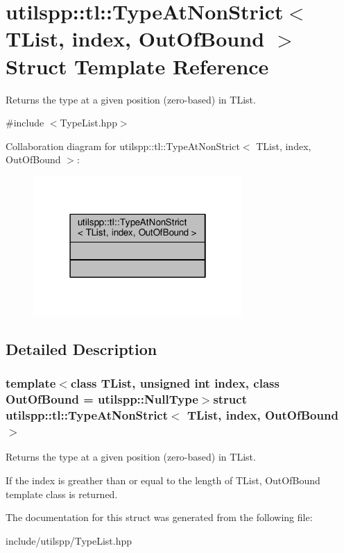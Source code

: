 \hypertarget{structutilspp_1_1tl_1_1TypeAtNonStrict}{\section{utilspp\-:\-:tl\-:\-:Type\-At\-Non\-Strict$<$ T\-List, index, Out\-Of\-Bound $>$ Struct Template Reference}
\label{structutilspp_1_1tl_1_1TypeAtNonStrict}
}


Returns the type at a given position (zero-\/based) in T\-List.  




{\ttfamily \#include $<$Type\-List.\-hpp$>$}



Collaboration diagram for utilspp\-:\-:tl\-:\-:Type\-At\-Non\-Strict$<$ T\-List, index, Out\-Of\-Bound $>$\-:\nopagebreak
\begin{figure}[H]
\begin{center}
\leavevmode
\includegraphics[width=226pt]{structutilspp_1_1tl_1_1TypeAtNonStrict__coll__graph}
\end{center}
\end{figure}


\subsection{Detailed Description}
\subsubsection*{template$<$class T\-List, unsigned int index, class Out\-Of\-Bound = utilspp\-::\-Null\-Type$>$struct utilspp\-::tl\-::\-Type\-At\-Non\-Strict$<$ T\-List, index, Out\-Of\-Bound $>$}

Returns the type at a given position (zero-\/based) in T\-List. 

If the index is greather than or equal to the length of T\-List, Out\-Of\-Bound template class is returned. 

The documentation for this struct was generated from the following file\-:\begin{DoxyCompactItemize}
\item 
include/utilspp/Type\-List.\-hpp\end{DoxyCompactItemize}
